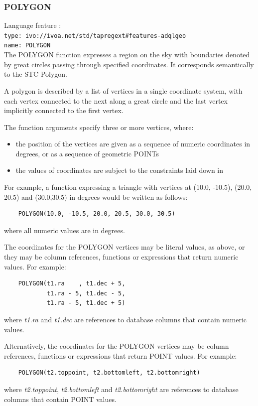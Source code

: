\documentclass[11pt,a4paper]{ivoa}
\begin{document}
\subsubsection{POLYGON}
\label{sec:functions.geom.polygon}
{\footnotesize Language feature :}\\
{\footnotesize \verb|type: ivo://ivoa.net/std/tapregext#features-adqlgeo|}\\
{\footnotesize \verb|name: POLYGON|}\\

The POLYGON function expresses a region on the sky with boundaries denoted by great
circles passing through specified coordinates. It corresponds semantically
to the STC Polygon.

A polygon is described by a list of vertices in a single coordinate system, with
each vertex connected to the next along a great circle and the last vertex
implicitly connected to the first vertex.

The function arguments specify three or more vertices, where:
\begin{itemize}
    \item the position of the vertices are given as a sequence of numeric
          coordinates in degrees, or as a sequence of geometric POINTs
    \item the values of coordinates are subject to the constraints laid down in
\end{itemize}

For example, a function expressing a triangle with vertices at (10.0,
-10.5), (20.0, 20.5) and (30.0,30.5) in degrees would be written
as follows:
\begin{verbatim}
    POLYGON(10.0, -10.5, 20.0, 20.5, 30.0, 30.5)
\end{verbatim}
\noindent
where all numeric values are in degrees.

The coordinates for the POLYGON vertices may be literal values, as above,
or they may be column references, functions or expressions that return
numeric values.
For example:
\begin{verbatim}
    POLYGON(t1.ra    , t1.dec + 5,
            t1.ra - 5, t1.dec - 5,
            t1.ra - 5, t1.dec + 5)
\end{verbatim}
\noindent
where \textit{t1.ra} and \textit{t1.dec} are references to database columns
that contain numeric values.

Alternatively, the coordinates for the POLYGON vertices may be column references,
functions or expressions that return POINT values.
For example:
\begin{verbatim}
    POLYGON(t2.toppoint, t2.bottomleft, t2.bottomright)
\end{verbatim}
\noindent
where \textit{t2.toppoint}, \textit{t2.bottomleft} and \textit{t2.bottomright}
are references to database columns that contain POINT values.
\end{document}
